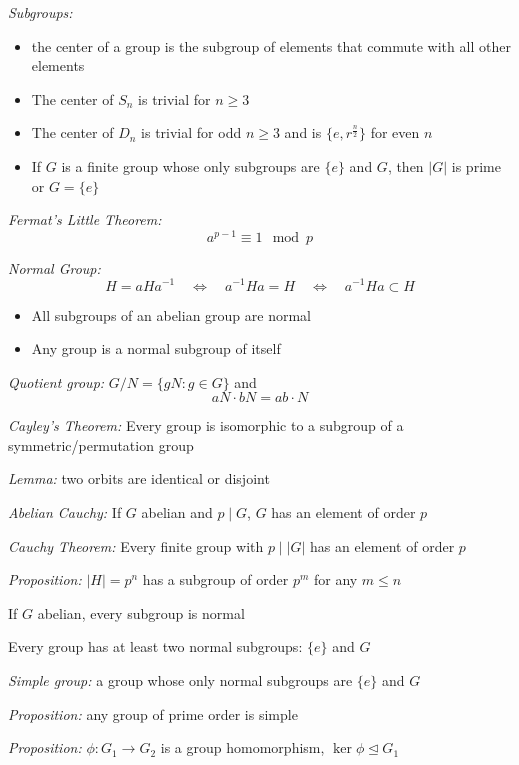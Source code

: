 \documentclass[9pt]{memoir}
\newcommand{\abs}[1]{\left\vert #1 \right\vert}
\begin{document}
\begin{multicols}{2}
    \emph{Subgroups:}
    \begin{itemize}
        \item the center of a group is the subgroup of elements that commute with all other elements
        \item The center of $S_n$ is trivial for $n \geq 3$
        \item The center of $D_n$ is trivial for odd $n \geq 3$ and is $\{e, r^{\frac{n}{2}}\}$ for even $n$ 
        \item If $G$ is a finite group whose only subgroups are $\{e\}$ and $G$, then $|G|$ is prime or $G = \{e\}$
    \end{itemize}

    \emph{Fermat's Little Theorem:}
    \[a^{p-1} \equiv 1 \mod p\]

    \emph{Normal Group:} 
    \[H = aHa^{-1} \quad \iff \quad a^{-1}Ha = H \quad \iff \quad a^{-1}Ha \subset H\]
    \begin{itemize}
        \item All subgroups of an abelian group are normal 
        \item Any group is a normal subgroup of itself
    \end{itemize}

    \emph{Quotient group:} $G/N = \{gN: g \in G\}$ and 
    \[aN \cdot bN = ab\cdot N\]

    \emph{Cayley's Theorem:} Every group is isomorphic to a subgroup of a symmetric/permutation group

    \emph{Lemma:} two orbits are identical or disjoint 

    \emph{Abelian Cauchy:} If $G$ abelian and $p \mid G$, $G$ has an element of order $p$ 

    \emph{Cauchy Theorem:} Every finite group with $p \mid \abs{G}$ has an element of order $p$

    \emph{Proposition:} $\abs{H} = p^n$ has a subgroup of order $p^m$ for any $m \leq n$

    If $G$ abelian, every subgroup is normal 

    Every group has at least two normal subgroups: $\{e\}$ and $G$ 

    \emph{Simple group:} a group whose only normal subgroups are $\{e\}$ and $G$

    \emph{Proposition:} any group of prime order is simple

    \emph{Proposition:} $\phi: G_1 \to G_2$ is a group homomorphism, $\ker \phi \trianglelefteq G_1$  


\end{multicols}
\end{document}
